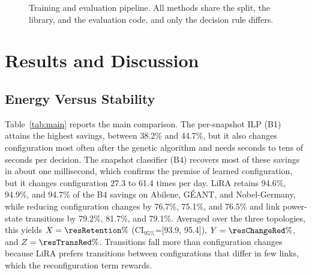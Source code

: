 \documentclass[conference]{IEEEtran}
\begin{document}
\begin{figure}[t]
\centering
{}
\caption{Training and evaluation pipeline. All methods share the split, the library, and the evaluation code, and only the decision rule differs.}
\label{fig:pipeline}
\end{figure}

\section{Results and Discussion}\label{sec:results}

\subsection{Energy Versus Stability}

Table~\ref{tab:main} reports the main comparison. The per-snapshot ILP (B1) attains the highest savings, between 38.2\% and 44.7\%, but it also changes configuration most often after the genetic algorithm and needs seconds to tens of seconds per decision. The snapshot classifier (B4) recovers most of these savings in about one millisecond, which confirms the premise of learned configuration, but it changes configuration 27.3 to 61.4 times per day. LiRA retains 94.6\%, 94.9\%, and 94.7\% of the B4 savings on Abilene, G\'{E}ANT, and Nobel-Germany, while reducing configuration changes by 76.7\%, 75.1\%, and 76.5\% and link power-state transitions by 79.2\%, 81.7\%, and 79.1\%. Averaged over the three topologies, this yields $X=\resRetention\%$ (CI$_{95\%}$=[93.9, 95.4]), $Y=\resChangeRed\%$, and $Z=\resTransRed\%$. Transitions fall more than configuration changes because LiRA prefers transitions between configurations that differ in few links, which the reconfiguration term rewards.
\end{document}
